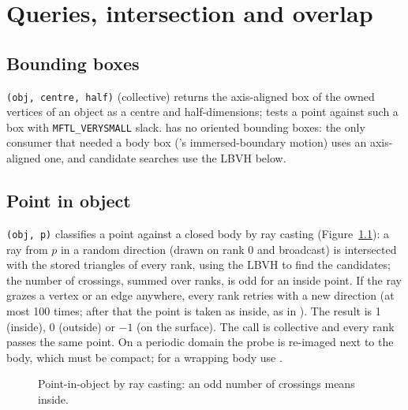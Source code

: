 \chapter{Queries, intersection and overlap}
\label{ch:queries}

\section{Bounding boxes}

\texttt{(obj, centre, half)} (collective) returns the axis-aligned box of the
owned vertices of an object as a centre and half-dimensions;  tests a
point against such a box with \texttt{MFTL\_VERYSMALL} slack. \mftl{} has no oriented bounding
boxes: the only consumer that needed a body box (\multi's immersed-boundary motion) uses an
axis-aligned one, and candidate searches use the LBVH below.

\section{Point in object}
\label{sec:pointinside}

\texttt{(obj, p)} classifies a point against a closed body by ray
casting (Figure~\ref{fig:raycast}): a ray from $p$ in a random direction (drawn on rank 0 and
broadcast) is intersected with the stored triangles of every rank, using the LBVH to find the
candidates; the number of crossings, summed over ranks, is odd for an inside point. If the ray
grazes a vertex or an edge anywhere, every rank retries with a new direction (at most 100
times; after that the point is taken as inside, as in \mftlone). The result is 1 (inside), 0
(outside) or $-1$ (on the surface). The call is collective and every rank passes the same
point. On a periodic domain the probe is re-imaged next to the body, which must be compact;
for a wrapping body use .

\begin{figure}[ht]
\centering
{}
\caption{Point-in-object by ray casting: an odd number of crossings means inside.}
\label{fig:raycast}
\end{figure}


